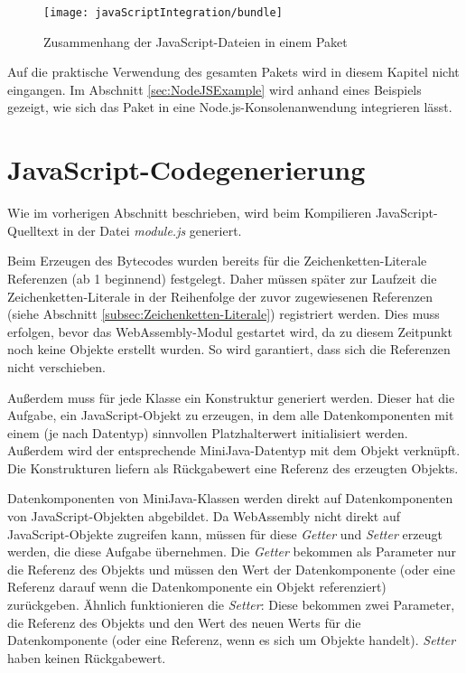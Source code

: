 \begin{figure}[]
    \centering
    \texttt{[image: javaScriptIntegration/bundle]}
    \caption{Zusammenhang der JavaScript-Dateien in einem Paket}
    \label{fig:bundleStructure}
\end{figure}

Auf die praktische Verwendung des gesamten Pakets wird in diesem Kapitel nicht eingangen. Im Abschnitt \ref{sec:NodeJSExample} wird anhand eines Beispiels gezeigt, wie sich das Paket in eine Node.js-Konsolenanwendung integrieren lässt.

\section{JavaScript-Codegenerierung}
\label{sec:JavaScript-Codegenerierung}

Wie im vorherigen Abschnitt beschrieben, wird beim Kompilieren Ja\-va\-Script-Quell\-text in der Datei \emph{module.js} generiert.

Beim Erzeugen des Bytecodes wurden bereits für die Zeichenketten-Literale Referenzen (ab 1 beginnend) festgelegt. Daher müssen später zur Laufzeit die Zeichenketten-Literale in der Reihenfolge der zuvor zugewiesenen Referenzen (siehe Abschnitt \ref{subsec:Zeichenketten-Literale}) registriert werden. Dies muss erfolgen, bevor das WebAssembly-Modul gestartet wird, da zu diesem Zeitpunkt noch keine Objekte erstellt wurden. So wird garantiert, dass sich die Referenzen nicht verschieben.

Außerdem muss für jede Klasse ein Konstruktur generiert werden. Dieser hat die Aufgabe, ein JavaScript-Objekt zu erzeugen, in dem alle Datenkomponenten mit einem (je nach Datentyp) sinnvollen Platzhalterwert initialisiert werden. Außerdem wird der entsprechende MiniJava-Datentyp mit dem Objekt verknüpft. Die Konstrukturen liefern als Rückgabewert eine Referenz des erzeugten Objekts.

Datenkomponenten von MiniJava-Klassen werden direkt auf Datenkomponenten von Java\-Script-Objekten abgebildet. Da WebAssembly nicht direkt auf JavaScript-Objekte zugreifen kann, müssen für diese \emph{Getter} und \emph{Setter} erzeugt werden, die diese Aufgabe übernehmen. Die \emph{Getter} bekommen als Parameter nur die Referenz des Objekts und müssen den Wert der Datenkomponente (oder eine Referenz darauf wenn die Datenkomponente ein Objekt referenziert) zurückgeben. Ähnlich funktionieren die \emph{Setter}: Diese bekommen zwei Parameter, die Referenz des Objekts und den Wert des neuen Werts für die Datenkomponente (oder eine Referenz, wenn es sich um Objekte handelt). \emph{Setter} haben keinen Rückgabewert.

